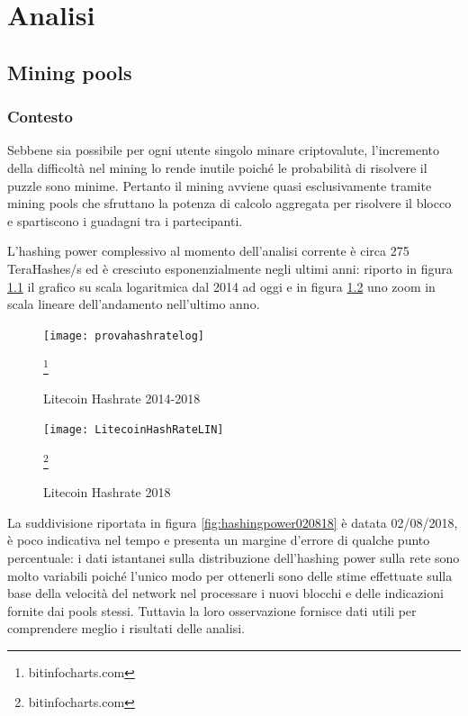 
\chapter{Analisi}


\section{Mining pools}

\subsection{Contesto}
Sebbene sia possibile per ogni utente singolo minare criptovalute, l’incremento della difficoltà nel mining lo rende inutile poiché le probabilità di risolvere il puzzle sono minime. Pertanto il mining avviene quasi esclusivamente tramite mining pools che sfruttano la potenza di calcolo aggregata per risolvere il blocco e spartiscono i guadagni tra i partecipanti.


L’hashing power complessivo al momento dell’analisi corrente è circa 275 TeraHashes/s ed è cresciuto esponenzialmente negli ultimi anni: riporto in figura \ref{fig:provahashratelog} il grafico su scala logaritmica dal 2014 ad oggi e in figura \ref{fig:litecoinhashratelin} uno zoom in scala lineare dell’andamento nell’ultimo anno.


\begin{figure}[h]
	\texttt{[image: provahashratelog]}
	\caption{Litecoin Hashrate 2014-2018}
	\label{fig:provahashratelog}
	\footnote{bitinfocharts.com}
\end{figure}

\begin{figure}
	\centering
	\texttt{[image: LitecoinHashRateLIN]}
	\caption{Litecoin Hashrate 2018} 
	\label{fig:litecoinhashratelin}
	\footnote{bitinfocharts.com}
\end{figure}


La suddivisione riportata in figura \ref{fig:hashingpower020818} è datata 02/08/2018, è poco indicativa nel tempo e presenta un margine d’errore di qualche punto percentuale: i dati istantanei sulla distribuzione dell’hashing power sulla rete sono molto variabili poiché l’unico modo per ottenerli sono delle stime effettuate sulla base della velocità del network nel processare i nuovi blocchi e delle indicazioni fornite dai pools stessi. Tuttavia la loro osservazione fornisce dati utili per comprendere meglio i risultati delle analisi.


